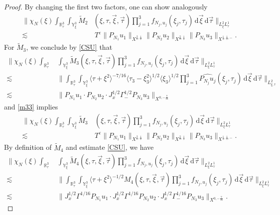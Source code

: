 \documentclass[reqno]{amsart}
\theoremstyle{Definitionl}
\theoremstyle{Definitionk}
\theoremstyle{definition}
\theoremstyle{Satzk}
\theoremstyle{Satzl}
\theoremstyle{Bemerkung}
\begin{document}
\begin{proof}
By changing the first two factors, one can show analogously
\begin{align}
\Big\|\chi_N(\xi)\int_{\mathbb R^3_\tau}\int_{\mathbb Y^3_\xi}\tilde M_2&(\xi,\tau,\vec\xi,\vec\tau)\prod_{j=1}^3f_{N_j,u_j}(\xi_j,\tau_j)\,\mathrm d\vec\xi\,\mathrm d\vec\tau\Big\|_{L^2_{\xi}L^1_\tau}\nonumber\\
\lesssim&\, T^\varepsilon\|P_{N_1}u_1\|_{X^{\frac38,\frac12}}\|P_{N_2}u_2\|_{X^{\frac38,\frac12}}\|P_{N_3}u_3\|_{X^{\frac12,\frac12,-}}.\label{tM2}
\end{align}
For $\tilde M_3$, we conclude by \eqref{CSU} that
\begin{align*}
\bigg\|\chi_N(\xi)\int_{\mathbb R^3_\tau}&\,\int_{\mathbb Y^3_\xi}\tilde M_3(\xi,\tau,\vec\xi,\vec\tau)\prod_{j=1}^3f_{N_j,u_j}(\xi_j,\tau_j)\,\mathrm d\vec\xi\,\mathrm d\vec\tau\bigg\|_{L^2_\xi L^1_\tau}\nonumber\\
\lesssim&\, \bigg\|\int_{\mathbb R^3_\tau}\int_{\mathbb Y^3_\xi}\langle\tau+\xi^2\rangle^{-7/16}\langle\tau_3-\xi_3^2\rangle^{1/2}\langle\xi_3\rangle^{1/2} \prod_{j=1}^3\widehat{P_{N_j}u_j}(\xi_j,\tau_j)\,\mathrm d\vec\xi\,\mathrm d\vec\tau\bigg\|_{L^2_{\xi,\tau}}\\
\lesssim&\, \big\|{P_{N_1}u_1}\cdot{P_{N_2}u_2}\cdot J_x^{1/2}\Gamma_-^{1/2}P_{N_3}u_3\big\|_{X^{0,-\frac7{16}}}
\end{align*}
and \eqref{m33} implies 
\begin{align}
\Big\|\chi_N(\xi)\int_{\mathbb R^3_\tau}\int_{\mathbb Y^3_\xi}\tilde M_3&\,(\xi,\tau,\vec\xi,\vec\tau)\prod_{j=1}^3f_{N_j,u_j}(\xi_j,\tau_j)\,\mathrm d\vec\xi\,\mathrm d\vec\tau\Big\|_{L^2_{\xi}L^1_\tau}\nonumber\\
\lesssim&\, T^\varepsilon \|P_{N_1}u_1\|_{X^{\frac38,\frac12}}\|P_{N_2}u_2\|_{X^{\frac38,\frac12}}\|P_{N_3}u_3\|_{X^{\frac12,\frac12,-}}
.\label{tM3}
\end{align}
By definition of $\tilde M_4$ and estimate \eqref{CSU}, we have
\begin{align*}
\bigg\|\chi_N(\xi)\int_{\mathbb R^3_\tau}&\,\int_{\mathbb Y^3_\xi}\tilde M_4(\xi,\tau,\vec\xi,\vec\tau)\prod_{j=1}^3f_{N_j,u_j}(\xi_j,\tau_j)\,\mathrm d\vec\xi\,\mathrm d\vec\tau\bigg\|_{L^2_\xi L^1_\tau}\\
\lesssim&\, \bigg\|\int_{\mathbb R^3_\tau}\int_{\mathbb Y^3_\xi}\langle\tau+\xi^2\rangle^{-1/2} M_4(\xi,\tau,\vec\xi,\vec\tau)\prod_{j=1}^3f_{N_j,u_j}(\xi_j,\tau_j)\,\mathrm d\vec\xi\,\mathrm d\vec\tau\bigg\|_{L^2_\xi L^1_\tau}\\
\lesssim&\, \big\|J_x^{1/2}\Gamma^{1/16}{P_{N_1}u_1}\cdot J_x^{1/2}\Gamma^{1/16}{P_{N_2}u_2}\cdot J_x^{1/2}\Gamma^{1/16}_-{P_{N_3}u_3}\big\|_{X^{0,-\frac{7}{16}}}.

\end{align*}
\end{proof}
\end{document}
